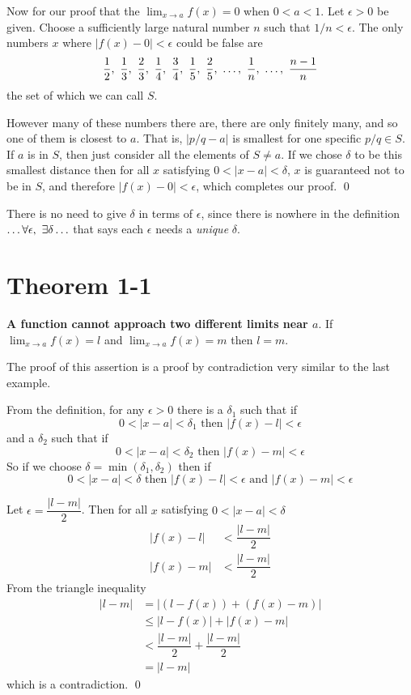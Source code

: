 \documentclass[10pt]{book}
\begin{document}
Now for our proof that the $\lim_{x \to a}f(x)=0$ when $0<a<1$. Let $\epsilon > 0$ be given. Choose a sufficiently large
natural number $n$ such that $1/n < \epsilon$. The only numbers $x$ where $|f(x)-0|<\epsilon$ could be false are
\[
  \frac12,\ \frac13,\ \frac23,\ \frac14,\ \frac34,\ \frac15,\ \frac25,\ \mathellipsis,\ \frac{1}{n},\ \mathellipsis,\ \frac{n-1}{n}
\]
the set of which we can call $S$.

However many of these numbers there are, there are only finitely many, and so one of them is closest to $a$. That is,
$|p/q-a|$ is smallest for one specific $p/q \in S$. If $a$ is in $S$, then just consider all the elements of $S \ne a$.
If we chose $\delta$ to be this smallest distance then for all $x$ satisfying $0 < |x-a| < \delta$, $x$ is guaranteed not
to be in $S$, and therefore $|f(x)-0|<\epsilon$, which completes our proof. \qed

There is no need to give $\delta$ in terms of $\epsilon$, since there is nowhere in the definition
$\mathellipsis \forall \epsilon, \ \exists \delta \mathellipsis$ that says each $\epsilon$ needs a \emph{unique} $\delta$.

\section{Theorem 1-1}
\textbf{A function cannot approach two different limits near $a$}. If $\lim_{x \to a}f(x)=l$ and $\lim_{x \to a}f(x)=m$ then
$l=m$.

The proof of this assertion is a proof by contradiction very similar to the last example.

From the definition, for any $\epsilon > 0$ there is a $\delta_1$ such that if
\[
  0 < |x-a| < \delta_1 \text{ then } |f(x)-l|<\epsilon
\]
and a $\delta_2$ such that if
\[
  0 < |x-a| < \delta_2 \text{ then } |f(x)-m|<\epsilon
\]
So if we choose $\delta=\min(\delta_1,\delta_2)$ then if
\[
  0 < |x-a| < \delta \text{ then } |f(x)-l| < \epsilon \text{ and }|f(x)-m| < \epsilon
\]

Let $\epsilon = \dfrac{|l-m|}{2}$. Then for all $x$ satisfying $0 < |x-a| < \delta$
\begin{align*}
  |f(x)-l| & < \dfrac{|l-m|}{2} \\
  |f(x)-m| & < \dfrac{|l-m|}{2}
\end{align*}
From the triangle inequality
\begin{align*}
  |l-m| & = |(l-f(x))+(f(x)-m)|                 \\
  & \le |l-f(x)| + |f(x)-m|               \\
  & < \dfrac{|l-m|}{2} + \dfrac{|l-m|}{2} \\
  & = |l-m|
\end{align*}
which is a contradiction. \qed
\end{document}
